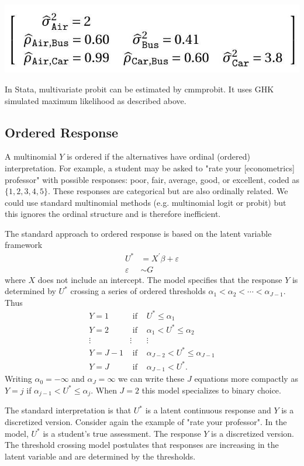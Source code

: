 \documentclass[10pt]{article}
\begin{document}
\includegraphics[max width=\textwidth]{2022_10_23_114e68a1ccdd7fb263a3g-15}

In Stata, multivariate probit can be estimated by cmmprobit. It uses GHK simulated maximum likelihood as described above.

\subsection{Ordered Response}
A multinomial $Y$ is ordered if the alternatives have ordinal (ordered) interpretation. For example, a student may be asked to "rate your [econometrics] professor" with possible responses: poor, fair, average, good, or excellent, coded as $\{1,2,3,4,5\}$. These responses are categorical but are also ordinally related. We could use standard multinomial methods (e.g. multinomial logit or probit) but this ignores the ordinal structure and is therefore inefficient.

The standard approach to ordered response is based on the latent variable framework
$$
\begin{aligned}
U^{*} &=X^{\prime} \beta+\varepsilon \\
\varepsilon & \sim G
\end{aligned}
$$
where $X$ does not include an intercept. The model specifies that the response $Y$ is determined by $U^{*}$ crossing a series of ordered thresholds $\alpha_{1}<\alpha_{2}<\cdots<\alpha_{J-1}$. Thus
$$
\begin{array}{ccc}
Y=1 & \text { if } & U^{*} \leq \alpha_{1} \\
Y=2 & \text { if } & \alpha_{1}<U^{*} \leq \alpha_{2} \\
\vdots & \vdots & \vdots \\
Y=J-1 & \text { if } & \alpha_{J-2}<U^{*} \leq \alpha_{J-1} \\
Y=J & \text { if } & \alpha_{J-1}<U^{*} .
\end{array}
$$
Writing $\alpha_{0}=-\infty$ and $\alpha_{J}=\infty$ we can write these $J$ equations more compactly as $Y=j$ if $\alpha_{j-1}<U^{*} \leq \alpha_{j}$. When $J=2$ this model specializes to binary choice.

The standard interpretation is that $U^{*}$ is a latent continuous response and $Y$ is a discretized version. Consider again the example of "rate your professor". In the model, $U^{*}$ is a student's true assessment. The response $Y$ is a discretized version. The threshold crossing model postulates that responses are increasing in the latent variable and are determined by the thresholds.
\end{document}
